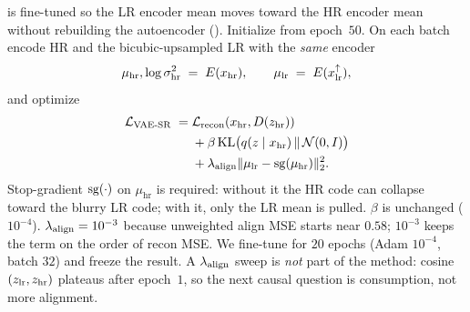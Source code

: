 \vaesr{} is \vaeone{} fine-tuned so the LR encoder mean moves toward
the HR encoder mean without rebuilding the autoencoder
().
Initialize from \vaeone{} epoch~$50$.
On each batch encode HR and the bicubic-upsampled LR with the
\emph{same} encoder
\begin{equation}
  \label{eq:mu-pair}
  \mu_{\mathrm{hr}},\log\sigma^2_{\mathrm{hr}} \;=\; E(x_{\mathrm{hr}}),\qquad
  \mu_{\mathrm{lr}} \;=\; E(x_{\mathrm{lr}}^{\uparrow}),
\end{equation}
and optimize
\begin{equation}
  \label{eq:vaesr}
  \begin{aligned}
    \mathcal{L}_{\mathrm{VAE\text{-}SR}}
    \;=\;
    &\mathcal{L}_{\mathrm{recon}}(x_{\mathrm{hr}},D(z_{\mathrm{hr}})) \\
    &+\beta\,\mathrm{KL}\bigl(q(z\mid x_{\mathrm{hr}})\,\Vert\,\mathcal{N}(0,I)\bigr) \\
    &+\lambda_{\mathrm{align}} \lVert \mu_{\mathrm{lr}} - \operatorname{sg}(\mu_{\mathrm{hr}}) \rVert_2^2.
  \end{aligned}
\end{equation}
Stop-gradient $\operatorname{sg}(\cdot)$ on $\mu_{\mathrm{hr}}$ is required: without
it the HR code can collapse toward the blurry LR code; with it, only
the LR mean is pulled.
$\beta$ is unchanged ($10^{-4}$).
$\lambda_{\mathrm{align}}=10^{-3}$ because unweighted align MSE starts near $0.58$;
$10^{-3}$ keeps the term on the order of recon MSE.
We fine-tune for $20$ epochs (Adam $10^{-4}$, batch $32$) and freeze
the result.
A $\lambda_{\mathrm{align}}$ sweep is \emph{not} part of the method: cosine$(z_{\mathrm{lr}},z_{\mathrm{hr}})$
plateaus after epoch~$1$, so the next causal question is consumption,
not more alignment.

